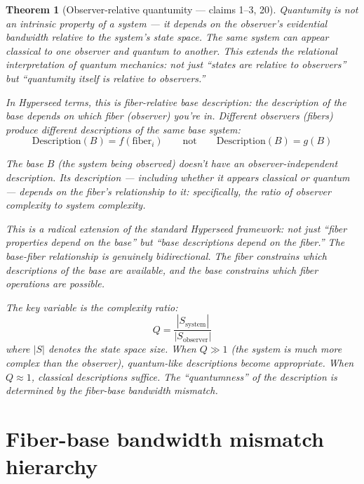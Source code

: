 \documentclass[11pt,a4paper]{article}
\newtheorem{theorem}[definition]{Theorem}
\begin{document}
\begin{theorem}[Observer-relative quantumity --- claims 1--3, 20]
\label{thm:relative}
Quantumity is not an intrinsic property of a system --- it depends on the
observer's evidential bandwidth relative to the system's state space. The
same system can appear classical to one observer and quantum to another.
This extends the relational interpretation of quantum mechanics: not just
``states are relative to observers'' but ``quantumity itself is relative
to observers.''

In Hyperseed terms, this is \emph{fiber-relative base description}: the
description of the base depends on which fiber (observer) you're in.
Different observers (fibers) produce different descriptions of the same
base system:
\[
  \text{Description}(B) = f(\text{fiber}_i) \qquad
  \text{not} \qquad \text{Description}(B) = g(B)
\]

The base $B$ (the system being observed) doesn't have an observer-independent
description. Its description --- including whether it appears classical or
quantum --- depends on the fiber's relationship to it: specifically, the ratio
of observer complexity to system complexity.

This is a radical extension of the standard Hyperseed framework: not just
``fiber properties depend on the base'' but ``base descriptions depend on
the fiber.'' The base-fiber relationship is genuinely bidirectional. The
fiber constrains which descriptions of the base are available, and the
base constrains which fiber operations are possible.

The key variable is the complexity ratio:
\[
  Q = \frac{|S_{\text{system}}|}{|S_{\text{observer}}|}
\]
where $|S|$ denotes the state space size. When $Q \gg 1$ (the system is
much more complex than the observer), quantum-like descriptions become
appropriate. When $Q \approx 1$, classical descriptions suffice. The
``quantumness'' of the description is determined by the fiber-base
bandwidth mismatch.
\end{theorem}

\section{Fiber-base bandwidth mismatch hierarchy}
\label{sec:hierarchy}
\end{document}
